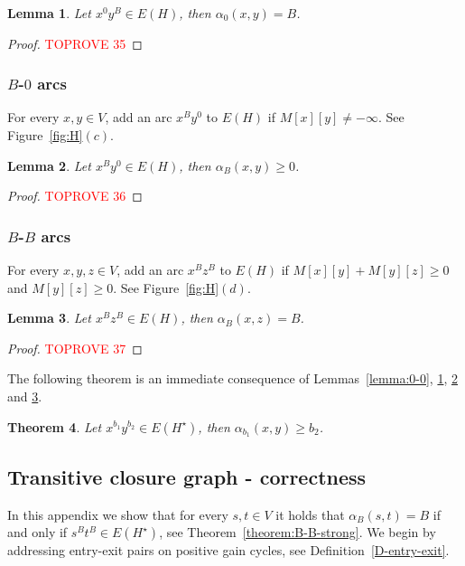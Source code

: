 \documentclass[11pt]{article}
\newtheorem{theorem}{Theorem}[section]
\newtheorem{lemma}[theorem]{Lemma}
\begin{document}
\begin{lemma}\label{lemma:0-B}
    Let $x^0 y^B\in E(H)$, then $\alpha_0(x,y) = B$.
\end{lemma}

\begin{proof}\textcolor{red}{TOPROVE 35}\end{proof}


\subsubsection{\texorpdfstring{$B$-$0$}{B-0} arcs}
For every $x,y\in V$, add an arc $x^B y^0$ to $E(H)$ if $M[x][y] \neq -\infty$. See Figure~\ref{fig:H}$(c)$.

\begin{lemma}\label{lemma:B-0}
    Let $x^B y^0 \in E(H)$, then $\alpha_B(x,y)\ge 0$. 
\end{lemma}

\begin{proof}\textcolor{red}{TOPROVE 36}\end{proof}


\subsubsection{\texorpdfstring{$B$-$B$}{B-B} arcs}
For every $x,y,z\in V$, add an arc $x^B z^B$ to $E(H)$ if $M[x][y]+M[y][z]\ge 0$ and $M[y][z]\ge 0$. See Figure~\ref{fig:H}$(d)$. 

\begin{lemma}\label{lemma:B-B}
    Let $x^B z^B \in E(H)$, then  $\alpha_B(x,z) = B$. 
\end{lemma}

\begin{proof}\textcolor{red}{TOPROVE 37}\end{proof}



The following theorem is an immediate consequence of Lemmas~\ref{lemma:0-0}, \ref{lemma:0-B}, \ref{lemma:B-0} and \ref{lemma:B-B}.

\begin{theorem}\label{theorem:trasitive-graph}
    Let $x^{b_1} y^{b_2} \in E(H^\star)$,
    then  $\alpha_{b_1}(x,y)\ge b_2$.
\end{theorem}

\subsection{Transitive closure graph - correctness}\label{section:transitive-correctness}
In this appendix we show that for every $s,t\in V$ it holds that $\alpha_B(s,t)=B$ if and only if $s^B t^B \in E(H^\star)$, see Theorem~\ref{theorem:B-B-strong}. We begin by addressing entry-exit pairs on positive gain cycles, see Definition~\ref{D-entry-exit}. 
\end{document}
